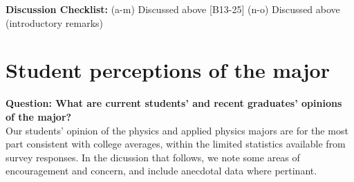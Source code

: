 \documentclass[12pt]{article}
\begin{document}
\noindent
{\bf Discussion Checklist:}
(a-m) Discussed above [B13-25] (n-o) Discussed above (introductory remarks) 

\section{Student perceptions of the major}
\label{sec:perceptions}

{\bf Question: What are current students' and recent graduates' opinions of the major? }\\

Our students' opinion of the physics and applied physics majors are
for the most part consistent with college averages, within the limited
statistics available from survey responses.  In the dicussion that follows,
we note some areas of encouragement and concern, and include anecdotal
data where pertinant.

\end{document}
